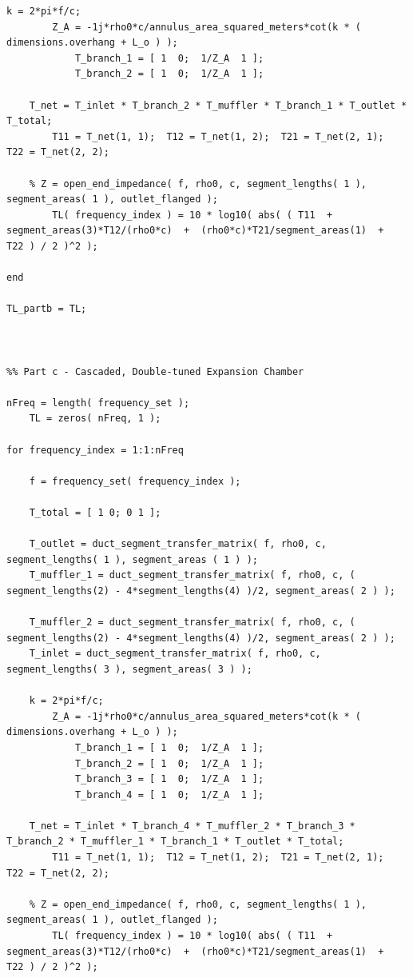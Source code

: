 \begin{lstlisting}[style=Matlab-editor, basicstyle=\fontfamily{pcr}, numbers=none, keepspaces, mlshowsectionrules, basicstyle=\footnotesize]
    k = 2*pi*f/c;
        Z_A = -1j*rho0*c/annulus_area_squared_meters*cot(k * ( dimensions.overhang + L_o ) );
            T_branch_1 = [ 1  0;  1/Z_A  1 ];
            T_branch_2 = [ 1  0;  1/Z_A  1 ];

    T_net = T_inlet * T_branch_2 * T_muffler * T_branch_1 * T_outlet * T_total;
        T11 = T_net(1, 1);  T12 = T_net(1, 2);  T21 = T_net(2, 1);  T22 = T_net(2, 2);

    % Z = open_end_impedance( f, rho0, c, segment_lengths( 1 ), segment_areas( 1 ), outlet_flanged );
        TL( frequency_index ) = 10 * log10( abs( ( T11  +  segment_areas(3)*T12/(rho0*c)  +  (rho0*c)*T21/segment_areas(1)  +  T22 ) / 2 )^2 );

end

TL_partb = TL;



%% Part c - Cascaded, Double-tuned Expansion Chamber

nFreq = length( frequency_set );
    TL = zeros( nFreq, 1 );

for frequency_index = 1:1:nFreq

    f = frequency_set( frequency_index );

    T_total = [ 1 0; 0 1 ];

    T_outlet = duct_segment_transfer_matrix( f, rho0, c, segment_lengths( 1 ), segment_areas ( 1 ) );
    T_muffler_1 = duct_segment_transfer_matrix( f, rho0, c, ( segment_lengths(2) - 4*segment_lengths(4) )/2, segment_areas( 2 ) );

    T_muffler_2 = duct_segment_transfer_matrix( f, rho0, c, ( segment_lengths(2) - 4*segment_lengths(4) )/2, segment_areas( 2 ) );
    T_inlet = duct_segment_transfer_matrix( f, rho0, c, segment_lengths( 3 ), segment_areas( 3 ) );

    k = 2*pi*f/c;
        Z_A = -1j*rho0*c/annulus_area_squared_meters*cot(k * ( dimensions.overhang + L_o ) );
            T_branch_1 = [ 1  0;  1/Z_A  1 ];
            T_branch_2 = [ 1  0;  1/Z_A  1 ];
            T_branch_3 = [ 1  0;  1/Z_A  1 ];
            T_branch_4 = [ 1  0;  1/Z_A  1 ];

    T_net = T_inlet * T_branch_4 * T_muffler_2 * T_branch_3 * T_branch_2 * T_muffler_1 * T_branch_1 * T_outlet * T_total;
        T11 = T_net(1, 1);  T12 = T_net(1, 2);  T21 = T_net(2, 1);  T22 = T_net(2, 2);

    % Z = open_end_impedance( f, rho0, c, segment_lengths( 1 ), segment_areas( 1 ), outlet_flanged );
        TL( frequency_index ) = 10 * log10( abs( ( T11  +  segment_areas(3)*T12/(rho0*c)  +  (rho0*c)*T21/segment_areas(1)  +  T22 ) / 2 )^2 );


\end{lstlisting}
